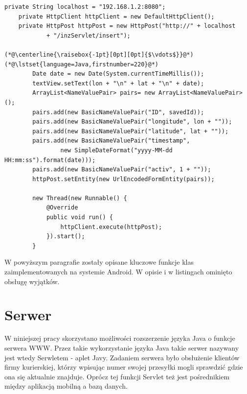 \documentclass[eng,printmode,oneside]{mgr}
\begin{document}
\begin{lstlisting}[caption=Przygotowanie wiadomości do wysłania na
serwer oraz wysłanie jej,label=polaczenieSerwer] 
	private String localhost = "192.168.1.2:8080";
	private HttpClient httpClient = new DefaultHttpClient();
	private HttpPost httpPost = new HttpPost("http://" + localhost
			+ "/inzServlet/insert");
			
(*@\centerline{\raisebox{-1pt}[0pt][0pt]{$\vdots$}}@*)
(*@\lstset{language=Java,firstnumber=220}@*)
		Date date = new Date(System.currentTimeMillis()); 
		textView.setText(lon + "\n" + lat + "\n" + date); 
		ArrayList<NameValuePair> pairs= new ArrayList<NameValuePair>(); 
		pairs.add(new BasicNameValuePair("ID", savedId));
		pairs.add(new BasicNameValuePair("longitude", lon + ""));
		pairs.add(new BasicNameValuePair("latitude", lat + ""));
		pairs.add(new BasicNameValuePair("timestamp",
				new SimpleDateFormat("yyyy-MM-dd HH:mm:ss").format(date)));
		pairs.add(new BasicNameValuePair("activ", 1 + ""));
		httpPost.setEntity(new UrlEncodedFormEntity(pairs));
		
		new Thread(new Runnable() {
			@Override
			public void run() {
				httpClient.execute(httpPost);
			}).start();
		}
\end{lstlisting}

W powyższym paragrafie zostały opisane kluczowe funkcje klas zaimplementowanych
na systemie Android. W opisie i w listingach ominięto obsługę wyjątków. 

\section{Serwer}

W niniejszej pracy skorzystano możliwości rozszerzenie języka Java o funkcje
serwera WWW. Przez takie wykorzystanie języka Java takie serwer nazywany jest
wtedy Serwletem - aplet Javy. Zadaniem serwera było obsłużenie klientów firmy
kurierskiej, którzy wpisując numer swojej przesyłki mogli sprawdzić gdzie ona
się aktualnie znajduje. Oprócz tej funkcji Servlet też jest pośrednikiem
między aplikacją mobilną a bazą danych.
\end{document}
